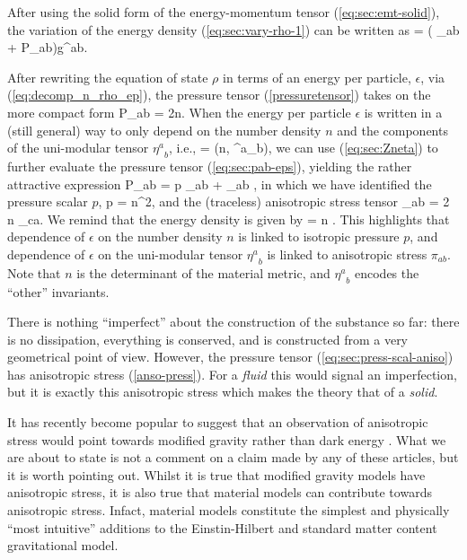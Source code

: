 After using the solid form of the energy-momentum tensor (\ref{eq:sec:emt-solid}), the variation of the energy density (\ref{eq:sec:vary-rho-1}) can be written as
\bea
\lp\rho = \left( \rho \gamma_{ab} + P_{ab}\right)\lp g^{ab}.
\eea


After rewriting the equation of state $\rho$ in terms of an energy per particle, $\epsilon$, via (\ref{eq:decomp_n_rho_ep}),  the pressure tensor (\ref{pressuretensor}) takes on  the more compact form
\bea
\label{eq:sec:pab-eps}
P_{ab} = 2n.
\eea
When the energy per particle $\epsilon$ is written in a (still general) way to only depend on the number density $n$ and the components of the  uni-modular tensor ${\eta^a}_b$, i.e., 
\bea
\epsilon = \epsilon(n, {\eta^a}_b),
\eea
we can use (\ref{eq:sec:Zneta}) to further evaluate the pressure tensor (\ref{eq:sec:pab-eps}), yielding the rather attractive expression
\bea
\label{eq:sec:press-scal-aniso}
P_{ab} = p \gamma_{ab} + \pi_{ab} ,
\eea
in which  we have identified the pressure scalar $p$,
\bse
\bea
\label{iso-ess}
p = n^2,
\eea
and the (traceless) anisotropic stress tensor
\bea
\label{anso-press}
\pi_{ab} = 2 n \eta_{c\langle a}.
\eea
We remind that the energy density is given by
\bea
\rho = n \epsilon.
\eea
\ese
This highlights that dependence of $\epsilon$ on the number density $n$ is linked to isotropic pressure $p$, and dependence of $\epsilon$ on the uni-modular tensor ${\eta^a}_b$ is linked to anisotropic stress $\pi_{ab}$. Note that $n$ is the determinant of the material metric, and ${\eta^a}_b$ encodes the ``other'' invariants.

There is nothing ``imperfect'' about the construction of the substance so far: there is no dissipation,   everything is conserved, and is constructed from a very geometrical point of view. However, the pressure tensor (\ref{eq:sec:press-scal-aniso}) has anisotropic stress (\ref{anso-press}). For a \textit{fluid} this would signal an imperfection, but it is exactly this anisotropic stress which makes the theory  that of a  \textit{solid}.

It has recently become popular to suggest that an observation of anisotropic stress would point towards modified gravity rather than dark energy \cite{Bellini:2014fua, Saltas:2014dha, Amendola:2014wma, Linder:2014fna}. What we are about to state is not a comment on a claim made by any of these articles, but it is worth pointing out. Whilst it is true that modified gravity models have anisotropic stress, it is also true that material models can contribute towards anisotropic stress. Infact, material models constitute the simplest and physically ``most intuitive'' additions to the Einstin-Hilbert and standard matter content gravitational model.



